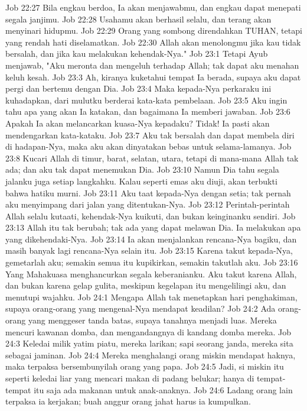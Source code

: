Job 22:27  Bila engkau berdoa, Ia akan menjawabmu, dan engkau dapat menepati segala janjimu.
Job 22:28  Usahamu akan berhasil selalu, dan terang akan menyinari hidupmu.
Job 22:29  Orang yang sombong direndahkan TUHAN, tetapi yang rendah hati diselamatkan.
Job 22:30  Allah akan menolongmu jika kau tidak bersalah, dan jika kau melakukan kehendak-Nya."
Job 23:1  Tetapi Ayub menjawab, "Aku meronta dan mengeluh terhadap Allah; tak dapat aku menahan keluh kesah.
Job 23:3  Ah, kiranya kuketahui tempat Ia berada, supaya aku dapat pergi dan bertemu dengan Dia.
Job 23:4  Maka kepada-Nya perkaraku ini kuhadapkan, dari mulutku berderai kata-kata pembelaan.
Job 23:5  Aku ingin tahu apa yang akan Ia katakan, dan bagaimana Ia memberi jawaban.
Job 23:6  Apakah Ia akan melancarkan kuasa-Nya kepadaku? Tidak! Ia pasti akan mendengarkan kata-kataku.
Job 23:7  Aku tak bersalah dan dapat membela diri di hadapan-Nya, maka aku akan dinyatakan bebas untuk selama-lamanya.
Job 23:8  Kucari Allah di timur, barat, selatan, utara, tetapi di mana-mana Allah tak ada; dan aku tak dapat menemukan Dia.
Job 23:10  Namun Dia tahu segala jalanku juga setiap langkahku. Kalau seperti emas aku diuji, akan terbukti bahwa hatiku murni.
Job 23:11  Aku taat kepada-Nya dengan setia; tak pernah aku menyimpang dari jalan yang ditentukan-Nya.
Job 23:12  Perintah-perintah Allah selalu kutaati, kehendak-Nya kuikuti, dan bukan keinginanku sendiri.
Job 23:13  Allah itu tak berubah; tak ada yang dapat melawan Dia. Ia melakukan apa yang dikehendaki-Nya.
Job 23:14  Ia akan menjalankan rencana-Nya bagiku, dan masih banyak lagi rencana-Nya selain itu.
Job 23:15  Karena takut kepada-Nya, gemetarlah aku; semakin semua itu kupikirkan, semakin takutlah aku.
Job 23:16  Yang Mahakuasa menghancurkan segala keberanianku. Aku takut karena Allah, dan bukan karena gelap gulita, meskipun kegelapan itu mengelilingi aku, dan menutupi wajahku.
Job 24:1  Mengapa Allah tak menetapkan hari penghakiman, supaya orang-orang yang mengenal-Nya mendapat keadilan?
Job 24:2  Ada orang-orang yang menggeser tanda batas, supaya tanahnya menjadi luas. Mereka mencuri kawanan domba, dan mengandangnya di kandang domba mereka.
Job 24:3  Keledai milik yatim piatu, mereka larikan; sapi seorang janda, mereka sita sebagai jaminan.
Job 24:4  Mereka menghalangi orang miskin mendapat haknya, maka terpaksa bersembunyilah orang yang papa.
Job 24:5  Jadi, si miskin itu seperti keledai liar yang mencari makan di padang belukar; hanya di tempat-tempat itu saja ada makanan untuk anak-anaknya.
Job 24:6  Ladang orang lain terpaksa ia kerjakan; buah anggur orang jahat harus ia kumpulkan.
